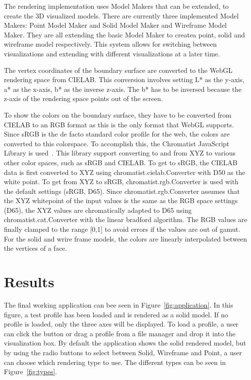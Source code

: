 The rendering implementation uses Model Makers that can be extended, to create the 3D visualized models.
There are currently three implemented Model Makers: Point Model Maker and Solid Model Maker and Wireframe Model Maker.
They are all extending the basic Model Maker to createa point, solid and wireframe model respectively.
This system allows for switching between visualizations and extending with different visualizations at a later time.

The vertex coordinates of the boundary surface are converted to the WebGL rendering space from CIELAB.
This conversion involves setting L* as the y-axis, a* as the x-axis, b* as the inverse z-axis.
The b* has to be inversed because the z-axis of the rendering space points out of the screen.

To show the colors on the boundary surface, they have to be converted from CIELAB to an RGB format as this is the only format that WebGL supports.
Since sRGB is the de facto standard color profile for the web, the colors are converted to this colorspace.
To accomplish this, the Chromatist JavaScript Library is used~\cite{Chromatist}.
This library support converting to and from XYZ to various other color spaces, such as sRGB and CIELAB.
To get to sRGB, the CIELAB data is first converted to XYZ using chromatist.cielab.Converter with D50 as the white point.
To get from XYZ to sRGB, chromatist.rgb.Converter is used with the default settings (sRGB, D65).
Since chromatist.rgb.Converter assumes that the XYZ whitepoint of the input values is the same as the RGB space settings (D65), the XYZ values are chromatically adapted to D65 using chromatist.cat.Converter with the linear bradford algorithm.
The RGB values are finally clamped to the range [0,1] to avoid errors if the values are out of gamut.
For the solid and wrire frame models, the colors are linearly interpolated between the vertices of a face.

\section{Results}
The final working application can bee seen in Figure~\ref{fig:application}.
In this figure, a test profile has been loaded and is rendered as a solid model.
If no profile is loaded, only the three axes will be displayed.
To load a profile, a user can click the  button or drag a profile from a file manager and drop it into the visualization box.
By default the application shows the solid rendered model, but by using the radio buttons to select between Solid, Wireframe and Point, a user can choose which rendering type to use.
The different types can be seen in Figure~\ref{fig:types}.


